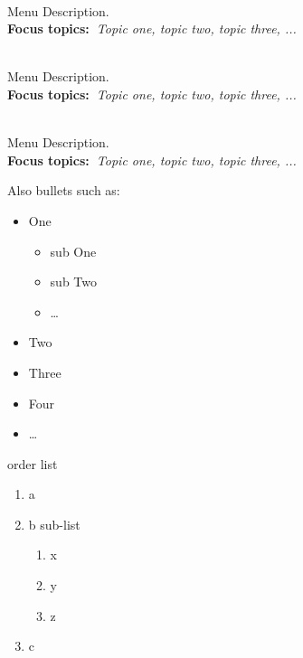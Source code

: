   \begin{description}\addtolength{\itemsep}{-0.35\baselineskip}%
  
    \item[\textbullet~\bfseries Menu Item] \hfill \\%
      Menu Description.~\\%
      {\textbf{Focus topics:~}\emph{Topic one, topic two, topic three, ...}}%
    
    \item[\textbullet~\bfseries Menu Item] \hfill \\%
      Menu Description.~\\%
      {\textbf{Focus topics:~}\emph{Topic one, topic two, topic three, ...}}%
    
    
    \item[\textbullet~\bfseries Menu Item] \hfill \\%
      Menu Description.~\\%
      {\textbf{Focus topics:~}\emph{Topic one, topic two, topic three, ...}}%
  
  \end{description}
  Also bullets such as:%
  \begin{itemize}\addtolength{\itemsep}{-0.35\baselineskip}%
    \item One%
        \begin{itemize}\addtolength{\itemsep}{-0.35\baselineskip}%
        \item sub One%
        \item sub Two%
        \item \ldots%
        \end{itemize}%
    \item Two%
    \item Three%
    \item Four%
    \item \ldots%
  \end{itemize}%
  
  
  order list
  \begin{enumerate}
      \item a
      \item b
       sub-list
            \begin{enumerate}
              \item x
              \item y
              \item z
            \end{enumerate}
      \item c
  \end{enumerate}
  
